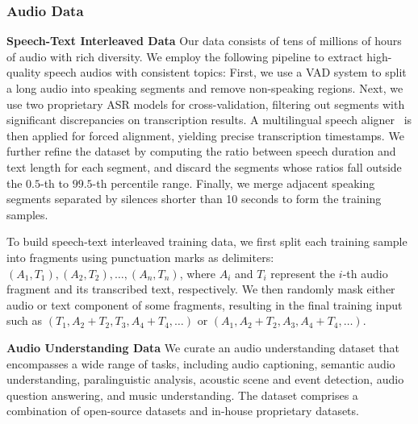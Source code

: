 \documentclass{article}
\begin{document}
\subsubsection{Audio Data} \label{sec:pretrain_audio_data} %
\textbf{Speech-Text Interleaved Data}
Our data consists of tens of millions of hours of audio with rich diversity.
We employ the following pipeline to extract high-quality speech audios with consistent topics:
First, we use a VAD system to split a long audio into speaking segments and remove non-speaking regions. Next, we use two proprietary ASR models for cross-validation, filtering out segments with significant discrepancies on transcription results. A multilingual speech aligner~\citep{pratap2024scaling} is then applied for forced alignment, yielding precise transcription timestamps.
We further refine the dataset by computing the ratio between speech duration and text length for each segment, and discard the segments whose ratios fall outside the $0.5$-th to $99.5$-th percentile range.
Finally, we merge adjacent speaking segments separated by silences shorter than 10 seconds to form the training samples.

To build speech-text interleaved training data, we first split each training sample into fragments using punctuation marks as delimiters: $(A_1, T_1), (A_2, T_2), \dots, (A_n, T_n)$, where $A_i$ and $T_i$ represent the $i$-th audio fragment and its transcribed text, respectively. We then randomly mask either audio or text component of some fragments, resulting in the final training input such as $(T_1, A_2+T_2, T_3, A_4+T_4, \dots)$ or $(A_1, A_2+T_2, A_3, A_4+T_4, \dots)$.

\textbf{Audio Understanding Data} We curate an audio understanding dataset that encompasses a wide range of tasks, including audio captioning, semantic audio understanding, paralinguistic analysis, acoustic scene and event detection, audio question answering, and music understanding.
The dataset comprises a combination of open-source datasets and in-house proprietary datasets.
\end{document}
